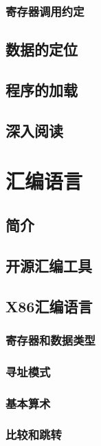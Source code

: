\documentclass[cn,11pt,chinese]{elegantbook}
\begin{document}
\subsection{寄存器调用约定}

\section{数据的定位}

\section{程序的加载}

\section{深入阅读}

\chapter{汇编语言}

\section{简介}

\section{开源汇编工具}

\section{X86汇编语言}

\subsection{寄存器和数据类型}

\subsection{寻址模式}

\subsection{基本算术}

\subsection{比较和跳转}
\end{document}
